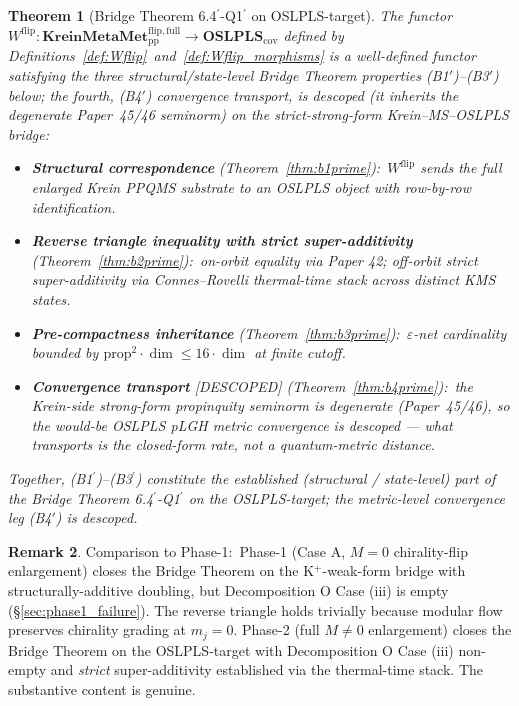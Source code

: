 \documentclass[11pt,a4paper]{article}
\theoremstyle{plain}
\newtheorem{theorem}{Theorem}[section]
\theoremstyle{definition}
\newtheorem{remark}[theorem]{Remark}
\newcommand{\OSLPLS}{\mathbf{OSLPLS}_{\mathrm{cov}}}
\newcommand{\KreinMMflip}{\mathbf{KreinMetaMet}_{\mathrm{pp}}^{\mathrm{flip},\mathrm{full}}}
\newcommand{\Wflip}{W^{\mathrm{flip}}}
\begin{document}
\begin{theorem}[Bridge Theorem 6.4$^{\prime}$-Q1$^{\prime}$ on
OSLPLS-target]\label{thm:bridge_strong}
The functor $\Wflip:\KreinMMflip\to\OSLPLS$ defined by
Definitions~\ref{def:Wflip}~and~\ref{def:Wflip_morphisms} is a
well-defined functor satisfying the three structural/state-level Bridge
Theorem properties (B1$'$)--(B3$'$) below; the fourth, (B4$'$)
convergence transport, is \emph{descoped} (it inherits the degenerate
Paper~45/46 seminorm) on
the strict-strong-form Krein--MS--OSLPLS bridge:
\begin{itemize}
\item[(B1$^{\prime}$)] \textbf{Structural correspondence}
(Theorem~\ref{thm:b1prime}):\ $\Wflip$ sends the full enlarged
Krein PPQMS substrate to an OSLPLS object with row-by-row
identification.
\item[(B2$^{\prime}$)] \textbf{Reverse triangle inequality with strict
super-additivity} (Theorem~\ref{thm:b2prime}):\ on-orbit equality via
Paper 42; off-orbit strict super-additivity via Connes--Rovelli
thermal-time stack across distinct KMS states.
\item[(B3$^{\prime}$)] \textbf{Pre-compactness inheritance}
(Theorem~\ref{thm:b3prime}):\ $\varepsilon$-net cardinality bounded
by $\mathrm{prop}^{2}\cdot\dim\le 16\cdot\dim$ at finite cutoff.
\item[(B4$^{\prime}$)] \textbf{Convergence transport} [\emph{DESCOPED}]
(Theorem~\ref{thm:b4prime}):\ the Krein-side strong-form propinquity
seminorm is degenerate (Paper~45/46), so the would-be OSLPLS pLGH
\emph{metric} convergence is descoped --- what transports is the
closed-form rate, not a quantum-metric distance.
\end{itemize}
Together, (B1$^{\prime}$)--(B3$^{\prime}$) constitute the established
(structural / state-level) part of the Bridge
Theorem 6.4$^{\prime}$-Q1$^{\prime}$ on the OSLPLS-target; the
metric-level convergence leg (B4$'$) is descoped.
\end{theorem}

\begin{remark}\label{rem:vs_phase1_comparison}
Comparison to Phase-1:\ Phase-1 (Case A, $M=0$ chirality-flip
enlargement) closes the Bridge Theorem on the K$^{+}$-weak-form
bridge with structurally-additive doubling, but Decomposition O
Case (iii) is empty (\S\ref{sec:phase1_failure}). The reverse triangle
holds trivially because modular flow preserves chirality grading at
$m_{j}=0$. Phase-2 (full $M\ne 0$ enlargement) closes the Bridge
Theorem on the OSLPLS-target with Decomposition O Case (iii) non-empty
and \emph{strict} super-additivity established via the thermal-time
stack. The substantive content is genuine.
\end{remark}
\end{document}
